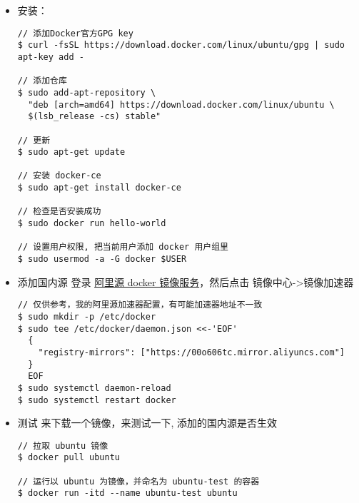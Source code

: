 \begin{itemize}
\item 安装：
\begin{lstlisting}
// 添加Docker官方GPG key
$ curl -fsSL https://download.docker.com/linux/ubuntu/gpg | sudo apt-key add -

// 添加仓库
$ sudo add-apt-repository \
  "deb [arch=amd64] https://download.docker.com/linux/ubuntu \
  $(lsb_release -cs) stable"

// 更新 
$ sudo apt-get update

// 安装 docker-ce 
$ sudo apt-get install docker-ce

// 检查是否安装成功 
$ sudo docker run hello-world

// 设置用户权限, 把当前用户添加 docker 用户组里
$ sudo usermod -a -G docker $USER

\end{lstlisting}

\item 添加国内源 
登录 \href{https://cr.console.aliyun.com/cn-hangzhou/instances/mirrors}{阿里源 docker 镜像服务}，然后点击 镜像中心->镜像加速器
\begin{lstlisting}
// 仅供参考，我的阿里源加速器配置，有可能加速器地址不一致
$ sudo mkdir -p /etc/docker
$ sudo tee /etc/docker/daemon.json <<-'EOF'
  {
    "registry-mirrors": ["https://00o606tc.mirror.aliyuncs.com"]
  }
  EOF
$ sudo systemctl daemon-reload
$ sudo systemctl restart docker
\end{lstlisting}

\item 测试
来下载一个镜像，来测试一下, 添加的国内源是否生效
\begin{lstlisting}
// 拉取 ubuntu 镜像
$ docker pull ubuntu

// 运行以 ubuntu 为镜像，并命名为 ubuntu-test 的容器 
$ docker run -itd --name ubuntu-test ubuntu
\end{lstlisting}
\end{itemize}
